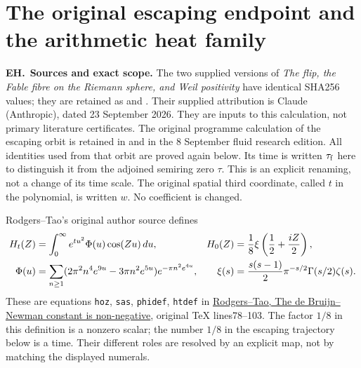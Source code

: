 \section{The original escaping endpoint and the arithmetic heat family}
\label{sec:eh}
\renewcommand{\theeh}{EH\arabic{eh}}
\newcommand{\EH}{\par\medskip\noindent\textbf{\theeh.}\ }

\EH\textbf{Sources and exact scope.}
The two supplied versions of \emph{The flip, the Fable fibre on the Riemann
sphere, and Weil positivity} have identical SHA256 values; they are retained
as  and . Their supplied
attribution is Claude (Anthropic), dated 23 September 2026. They are inputs
to this calculation, not primary literature certificates. The original
programme calculation of the escaping orbit is retained in
 and
 in the 8 September fluid research edition.
All identities used from that orbit are proved again below. Its time is
written $\tau_{\rm f}$ here to distinguish it from the adjoined semiring
zero $\tau$. This is an explicit renaming, not a change of its time scale.
The original spatial third coordinate, called $t$ in the polynomial, is
written $w$. No coefficient is changed.

Rodgers--Tao's original author source defines
\begin{align}
 H_t(Z)&=\int_0^\infty e^{tu^2}\Phi(u)\cos(Zu)\,du,
 &H_0(Z)&=\frac18\xi\left(\frac12+\frac{iZ}{2}\right),\label{eq:eh-heat}\\
 \Phi(u)&=\sum_{n\ge1}(2\pi^2n^4e^{9u}-3\pi n^2e^{5u})
 e^{-\pi n^2e^{4u}},
 &\xi(s)&=\frac{s(s-1)}2\pi^{-s/2}\Gamma(s/2)\zeta(s).\notag
\end{align}
These are equations \texttt{hoz}, \texttt{sas}, \texttt{phidef},
\texttt{htdef} in \href{https://arxiv.org/abs/1801.05914v5}{Rodgers--Tao,
The de Bruijn--Newman constant is non-negative}, original TeX lines78--103.
The factor $1/8$ in this definition is a nonzero scalar; the number $1/8$
in the escaping trajectory below is a time. Their different roles are
resolved by an explicit map, not by matching the displayed numerals.

